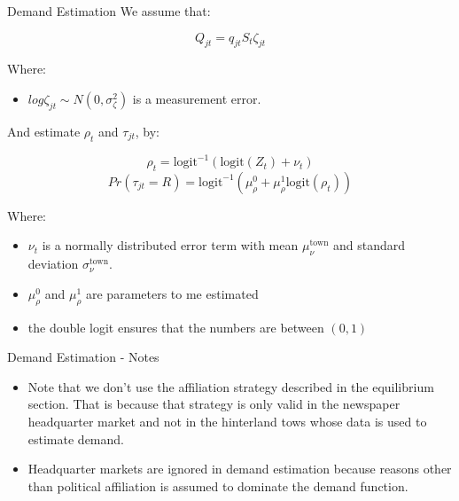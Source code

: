 \documentclass{beamer}
\newcommand{\var}{\text{var}}
\newcommand{\cov}{\text{cov}}
\newcommand{\logit}{\text{logit}}
\begin{document}
\begin{frame}[t]{Demand Estimation}
  We assume that:

  \[ Q_{jt} = q_{jt}S_t\zeta_{jt} \]

  Where:
  \begin{itemize}
    \item $log \zeta_{jt} \sim N(0, \sigma^2_\zeta)$ is a measurement error.
  \end{itemize}

  And estimate $\rho_t$ and $\tau_{jt}$, by:

  \[ \rho_t = \logit^{-1}(\logit(Z_t) + \nu_t) \]
  \[ Pr( \tau_{jt} = R ) = \logit^{-1}( \mu^0_\rho + \mu^1_\rho \logit(\rho_t)) \]

  Where:
  \begin{itemize}
    \item $\nu_t$ is a normally distributed error term with mean 
      $\mu^{\text{town}}_{ \nu}$ and standard deviation 
      $\sigma^{\text{town}}_\nu$.
    \item $\mu^0_\rho$ and $\mu^1_\rho$ are parameters to me estimated
    \item the double logit ensures that the numbers are between $(0, 1)$
  \end{itemize}

\end{frame}

\begin{frame}[t]{Demand Estimation - Notes}
  \begin{itemize}
    \item Note that we don't use the affiliation strategy described in the equilibrium section.
    That is because that strategy is only valid in the newspaper headquarter market
    and not in the hinterland tows whose data is used to estimate demand.
  \item Headquarter markets are ignored in demand estimation because reasons other
    than political affiliation is assumed to dominate the demand function.
  \end{itemize}

\end{frame}
\end{document}

